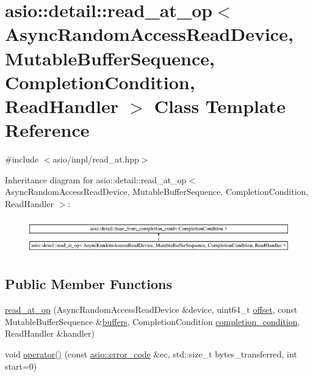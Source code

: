 \hypertarget{classasio_1_1detail_1_1read__at__op}{}\section{asio\+:\+:detail\+:\+:read\+\_\+at\+\_\+op$<$ Async\+Random\+Access\+Read\+Device, Mutable\+Buffer\+Sequence, Completion\+Condition, Read\+Handler $>$ Class Template Reference}
\label{classasio_1_1detail_1_1read__at__op}


{\ttfamily \#include $<$asio/impl/read\+\_\+at.\+hpp$>$}

Inheritance diagram for asio\+:\+:detail\+:\+:read\+\_\+at\+\_\+op$<$ Async\+Random\+Access\+Read\+Device, Mutable\+Buffer\+Sequence, Completion\+Condition, Read\+Handler $>$\+:\begin{figure}[H]
\begin{center}
\leavevmode
\includegraphics[height=1.562064cm]{classasio_1_1detail_1_1read__at__op}
\end{center}
\end{figure}
\subsection*{Public Member Functions}
\begin{DoxyCompactItemize}
\item 
\hyperlink{classasio_1_1detail_1_1read__at__op_af5cf9ad0aad6944248a1dbaf9d7d2438}{read\+\_\+at\+\_\+op} (Async\+Random\+Access\+Read\+Device \&device, uint64\+\_\+t \hyperlink{group__async__read__at_ga8dcdb41a4adfd6fe5322b5dd666d9f29}{offset}, const Mutable\+Buffer\+Sequence \&\hyperlink{group__async__read_ga54dede45c3175148a77fe6635222c47d}{buffers}, Completion\+Condition \hyperlink{group__async__read_gae2e215d5013596cc2b385bb6c13fa518}{completion\+\_\+condition}, Read\+Handler \&handler)
\item 
void \hyperlink{classasio_1_1detail_1_1read__at__op_a126728b8b47ee00aaf8bfcc5d3e9ce39}{operator()} (const \hyperlink{classasio_1_1error__code}{asio\+::error\+\_\+code} \&ec, std\+::size\+\_\+t bytes\+\_\+transferred, int start=0)
\end{DoxyCompactItemize}
